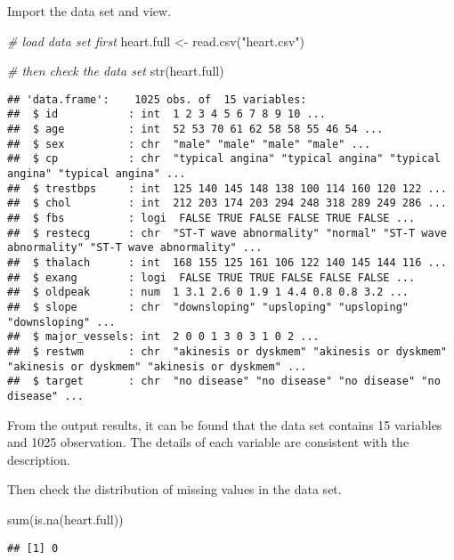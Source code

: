 \documentclass[
]{article}
\newenvironment{Shaded}{\begin{snugshade}}{\end{snugshade}}
\newcommand{\CommentTok}[1]{\textcolor[rgb]{0.56,0.35,0.01}{\textit{#1}}}
\newcommand{\FunctionTok}[1]{\textcolor[rgb]{0.00,0.00,0.00}{#1}}
\newcommand{\NormalTok}[1]{#1}
\newcommand{\OtherTok}[1]{\textcolor[rgb]{0.56,0.35,0.01}{#1}}
\newcommand{\StringTok}[1]{\textcolor[rgb]{0.31,0.60,0.02}{#1}}
\begin{document}
Import the data set and view.

\begin{Shaded}
\begin{Highlighting}[]
\CommentTok{\# load data set first}
\NormalTok{heart.full }\OtherTok{\textless{}{-}} \FunctionTok{read.csv}\NormalTok{(}\StringTok{"heart.csv"}\NormalTok{)}

\CommentTok{\# then check the data set}
\FunctionTok{str}\NormalTok{(heart.full)}
\end{Highlighting}
\end{Shaded}

\begin{verbatim}
## 'data.frame':    1025 obs. of  15 variables:
##  $ id           : int  1 2 3 4 5 6 7 8 9 10 ...
##  $ age          : int  52 53 70 61 62 58 58 55 46 54 ...
##  $ sex          : chr  "male" "male" "male" "male" ...
##  $ cp           : chr  "typical angina" "typical angina" "typical angina" "typical angina" ...
##  $ trestbps     : int  125 140 145 148 138 100 114 160 120 122 ...
##  $ chol         : int  212 203 174 203 294 248 318 289 249 286 ...
##  $ fbs          : logi  FALSE TRUE FALSE FALSE TRUE FALSE ...
##  $ restecg      : chr  "ST-T wave abnormality" "normal" "ST-T wave abnormality" "ST-T wave abnormality" ...
##  $ thalach      : int  168 155 125 161 106 122 140 145 144 116 ...
##  $ exang        : logi  FALSE TRUE TRUE FALSE FALSE FALSE ...
##  $ oldpeak      : num  1 3.1 2.6 0 1.9 1 4.4 0.8 0.8 3.2 ...
##  $ slope        : chr  "downsloping" "upsloping" "upsloping" "downsloping" ...
##  $ major_vessels: int  2 0 0 1 3 0 3 1 0 2 ...
##  $ restwm       : chr  "akinesis or dyskmem" "akinesis or dyskmem" "akinesis or dyskmem" "akinesis or dyskmem" ...
##  $ target       : chr  "no disease" "no disease" "no disease" "no disease" ...
\end{verbatim}

From the output results, it can be found that the data set contains 15
variables and 1025 observation. The details of each variable are
consistent with the description.

Then check the distribution of missing values in the data set.

\begin{Shaded}
\begin{Highlighting}[]
\FunctionTok{sum}\NormalTok{(}\FunctionTok{is.na}\NormalTok{(heart.full))}
\end{Highlighting}
\end{Shaded}

\begin{verbatim}
## [1] 0
\end{verbatim}
\end{document}
